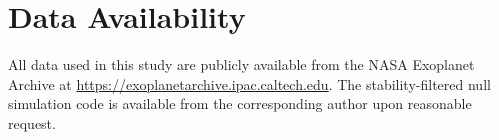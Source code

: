 \documentclass[twocolumn,usenatbib]{mnras}
\begin{document}
\section*{Data Availability}

All data used in this study are publicly available from the NASA Exoplanet
Archive at \url{https://exoplanetarchive.ipac.caltech.edu}. The
stability-filtered null simulation code is available from the corresponding
author upon reasonable request.




\label{lastpage}
\end{document}
